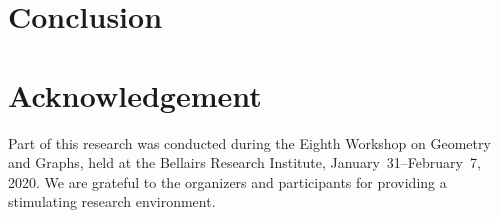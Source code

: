 \documentclass[kpfonts]{patmorin}
\newcommand{\snote}[1]{\fcolorbox{red}{yellow}{#1}}
\begin{document}
\section{Conclusion}


\section*{Acknowledgement}

Part of this research was conducted during the Eighth Workshop on Geometry and Graphs, held at the Bellairs Research Institute, January~31--February~7, 2020.  We are grateful to the organizers and participants for providing a stimulating research environment.


% 
% 
% 
% 
% 
% 
% 
% 
% 
% 
% 
% 
% 
% 
% 
% 
% 
% 
% 
% 
% 
% 
% 
% 
% 
% 
% 
% 
% 
% 
% 
% 
% 
% 
\end{document}
